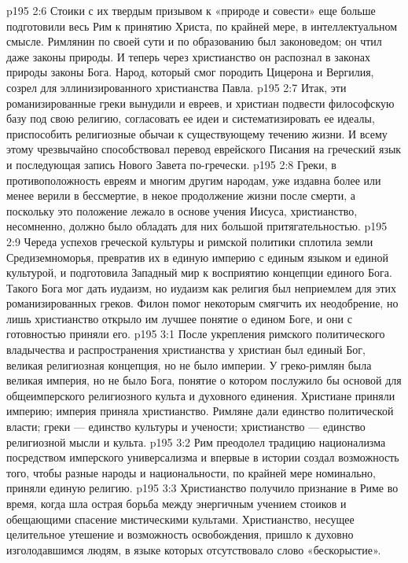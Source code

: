 \vs p195 2:6 \pc Стоики с их твердым призывом к «природе и совести» еще больше подготовили весь Рим к принятию Христа, по крайней мере, в интеллектуальном смысле. Римлянин по своей сути и по образованию был законоведом; он чтил даже законы природы. И теперь через христианство он распознал в законах природы законы Бога. Народ, который смог породить Цицерона и Вергилия, созрел для эллинизированного христианства Павла.
\vs p195 2:7 Итак, эти романизированные греки вынудили и евреев, и христиан подвести философскую базу под свою религию, согласовать ее идеи и систематизировать ее идеалы, приспособить религиозные обычаи к существующему течению жизни. И всему этому чрезвычайно способствовал перевод еврейского Писания на греческий язык и последующая запись Нового Завета по\hyp{}гречески.
\vs p195 2:8 Греки, в противоположность евреям и многим другим народам, уже издавна более или менее верили в бессмертие, в некое продолжение жизни после смерти, а поскольку это положение лежало в основе учения Иисуса, христианство, несомненно, должно было обладать для них большой притягательностью.
\vs p195 2:9 Череда успехов греческой культуры и римской политики сплотила земли Средиземноморья, превратив их в единую империю с единым языком и единой культурой, и подготовила Западный мир к восприятию концепции единого Бога. Такого Бога мог дать иудаизм, но иудаизм как религия был неприемлем для этих романизированных греков. Филон помог некоторым смягчить их неодобрение, но лишь христианство открыло им лучшее понятие о едином Боге, и они с готовностью приняли его.
\vs p195 3:1 После укрепления римского политического владычества и распространения христианства у христиан был единый Бог, великая религиозная концепция, но не было империи. У греко\hyp{}римлян была великая империя, но не было Бога, понятие о котором послужило бы основой для общеимперского религиозного культа и духовного единения. Христиане приняли империю; империя приняла христианство. Римляне дали единство политической власти; греки --- единство культуры и учености; христианство --- единство религиозной мысли и культа.
\vs p195 3:2 Рим преодолел традицию национализма посредством имперского универсализма и впервые в истории создал возможность того, чтобы разные народы и национальности, по крайней мере номинально, приняли единую религию.
\vs p195 3:3 Христианство получило признание в Риме во время, когда шла острая борьба между энергичным учением стоиков и обещающими спасение мистическими культами. Христианство, несущее целительное утешение и возможность освобождения, пришло к духовно изголодавшимся людям, в языке которых отсутствовало слово «бескорыстие».
